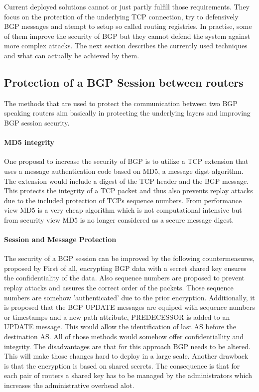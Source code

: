 \documentclass[12pt]{IEEEtran}
\begin{document}
		Current deployed solutions cannot or just partly fulfill those requirements. They focus on the protection of the underlying TCP connection, try to defensively BGP messages and atempt to setup so called routing registries. In practise, some of them improve the security of BGP but they cannot defend the system against more complex attacks. The next section describes the currently used techniques and what can actually be achieved by them. 

	
	\subsection{Protection of a BGP Session between routers}
		The methods that are used to protect the communication between two BGP speaking routers aim basically in protecting the underlying layers and improving BGP session security.
		\paragraph{MD5 integrity} One proposal to increase the security of BGP is to utilize a TCP extension that uses a message authentication code based on MD5, a message digst algorithm. The extension would include a digest of the TCP header and the BGP message.  This protects the integrity of a TCP packet and thus also prevents replay attacks due to the included protection of TCPs sequence numbers. From performance view MD5 is a very cheap algorithm which is  not computational intensive but from security view MD5 is no longer considered as a secure message digest. %

		\paragraph{Session and Message Protection}
		The security of a BGP session can be improved by the following countermeasures, proposed by %
		First of all, encrypting BGP data with a secret shared key ensures the confidentiality of the data. Also sequence numbers are proposed to prevent replay attacks and assures the correct order of the packets. Those sequence numbers are somehow 'authenticated' due to the prior encryption. 
		Additionally, it is proposed that the BGP UPDATE messages are equiped with  sequence numbers or timestamps and a new path attribute, PREDECESSOR is added to an UPDATE message. This would allow the identification of last AS before the destination AS. All of those methods would somehow offer confidentiallity and integrity. The disadvantages are that for this approach BGP needs to be altered. This will make those changes hard to deploy in a large scale. Another drawback is that the encryption is based on shared secrets. The consequence is that for each pair of routers a shared key has to be managed by the administrators which increases the administrative overhead alot.
					       
\end{document}
